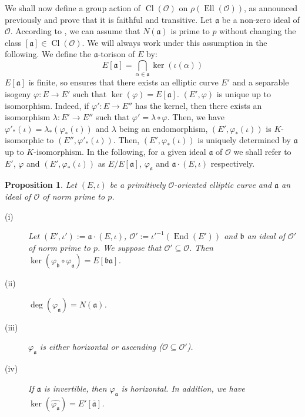 \documentclass[a4paper,10pt]{report}
\theoremstyle{definition}
\theoremstyle{plain}
\newtheorem{proposition}[definition]{Proposition}
\theoremstyle{definition}
\newcommand{\mO}{\mathcal{O}}
\renewcommand{\(}{\left(}
\renewcommand{\)}{\right)}
\newcommand{\mf}[1]{\mathfrak{#1}}
\DeclareMathOperator{\End}{End}
\DeclareMathOperator{\Cl}{Cl}
\DeclareMathOperator{\Ell}{Ell}
\begin{document}
We shall now define a group action of $\Cl(\mO)$ on $\rho(\Ell(\mO))$, as announced previously and prove that it is faithful and transitive. Let $\mf{a}$ be a non-zero ideal of $\mO$. According to \cite[corollary 7.17]{Cox}, we can assume that $N(\mf{a})$ is prime to $p$ without changing the class $[\mf{a}]\in\Cl(\mO)$. We will always work under this assumption in the following. We define the $\mf{a}$-torison of $E$ by:
\[E[\mf{a}]=\bigcap_{\alpha\in\mf{a}}\ker(\iota(\alpha))\]
$E[\mf{a}]$ is finite, so \cite[proposition III.4.12]{Silverman1} ensures that there exists an elliptic curve $E'$ and a separable isogeny $\varphi:E\longrightarrow E'$ such that $\ker(\varphi)=E[\mf{a}]$. $(E',\varphi)$ is unique up to isomorphism. Indeed, if $\varphi':E\longrightarrow E''$ has the kernel, then there exists an isomorphism $\lambda : E'\longrightarrow E''$ such that $\varphi'=\lambda\circ\varphi$. Then, we have $\varphi'_*(\iota)=\lambda_*(\varphi_*(\iota))$ and $\lambda$ being an endomorphism, $(E',\varphi_*(\iota))$ is $K$-isomorphic to $(E'',\varphi'_*(\iota))$. Then, $(E',\varphi_*(\iota))$ is uniquely determined by $\mf{a}$ up to $K$-isomorphism. In the following, for a given ideal $\mf{a}$ of $\mO$ we shall refer to  $E'$, $\varphi$ and $(E',\varphi_*(\iota))$ as $E/E[\mf{a}]$, $\varphi_{\mf{a}}$ and $\mf{a}\cdot(E,\iota)$ respectively.

\begin{proposition}\label{proposition 3}
Let $(E,\iota)$ be a primitively $\mO$-oriented elliptic curve and $\mf{a}$ an ideal of $\mO$ of norm prime to $p$. 
\begin{description}
\item[(i)] Let $(E',\iota'):=\mf{a}\cdot (E,\iota)$,  $\mO':=\iota'^{-1}(\End(E'))$ and $\mf{b}$ an ideal of $\mO'$ of norm prime to $p$.  We suppose that $\mO'\subseteq\mO$. Then $\ker(\varphi_{\mf{b}}\circ\varphi_{\mf{a}})=E[\mf{b}\mf{a}]$.
\item[(ii)] $\deg(\varphi_{\mf{a}})=N(\mf{a})$.
\item[(iii)] $\varphi_{\mf{a}}$ is either horizontal or ascending ($\mO\subseteq\mO'$).
\item[(iv)] If $\mf{a}$ is invertible, then $\varphi_{\mf{a}}$ is horizontal. In addition, we have $\ker(\widehat{\varphi_{\mf{a}}})=E'[\overline{\mf{a}}]$.
\end{description}
\end{proposition}
\end{document}
